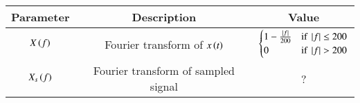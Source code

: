 \begin{tabular}{|c|c|c|}
        \hline
        \textbf{Parameter} & \textbf{Description} & \textbf{Value} \\
        \hline
        $X\left(f\right)$ & Fourier transform of $x\left(t\right)$ & $\begin{cases} 1 - \frac{\left\vert f\right\vert}{200} & \text{if } \left\vert f\right\vert \leq 200 \\ 0 & \text{if } \left\vert f\right\vert > 200 \end{cases} $  \\
        \hline
        $X_s\left(f\right)$ & Fourier transform of sampled signal & ?\\
        \hline
        
    \end{tabular}

